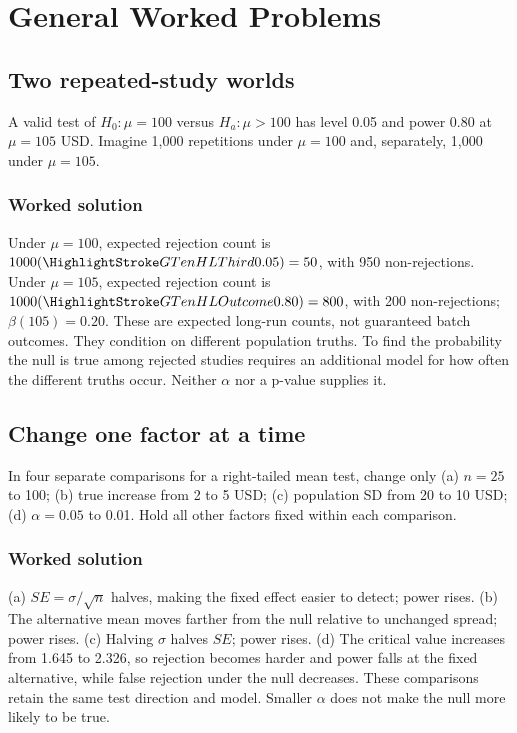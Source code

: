 \section{General Worked Problems}\label{sec:general-worked}
\subsection{Two repeated-study worlds}\label{prob:frequency}
A valid test of $H_0:\mu=100$ versus $H_a:\mu>100$ has level 0.05 and power 0.80 at $\mu=105$ USD. Imagine 1,000 repetitions under $\mu=100$ and, separately, 1,000 under $\mu=105$.
\subsubsection*{Worked solution}\label{sol:frequency}
Under $\mu=100$, expected rejection count is $1000(\Design{0.05})=50$, with 950 non-rejections. Under $\mu=105$, expected rejection count is $1000(\Result{0.80})=800$, with 200 non-rejections; $\beta(105)=0.20$. These are expected long-run counts, not guaranteed batch outcomes. They condition on different population truths. To find the probability the null is true among rejected studies requires an additional model for how often the different truths occur. Neither $\alpha$ nor a p-value supplies it.
\subsection{Change one factor at a time}\label{prob:design}
In four separate comparisons for a right-tailed mean test, change only (a) $n=25$ to 100; (b) true increase from 2 to 5 USD; (c) population SD from 20 to 10 USD; (d) $\alpha=0.05$ to 0.01. Hold all other factors fixed within each comparison.
\subsubsection*{Worked solution}\label{sol:design}
(a) $SE=\sigma/\sqrt n$ halves, making the fixed effect easier to detect; power rises. (b) The alternative mean moves farther from the null relative to unchanged spread; power rises. (c) Halving $\sigma$ halves $SE$; power rises. (d) The critical value increases from 1.645 to 2.326, so rejection becomes harder and power falls at the fixed alternative, while false rejection under the null decreases. These comparisons retain the same test direction and model. Smaller $\alpha$ does not make the null more likely to be true.
